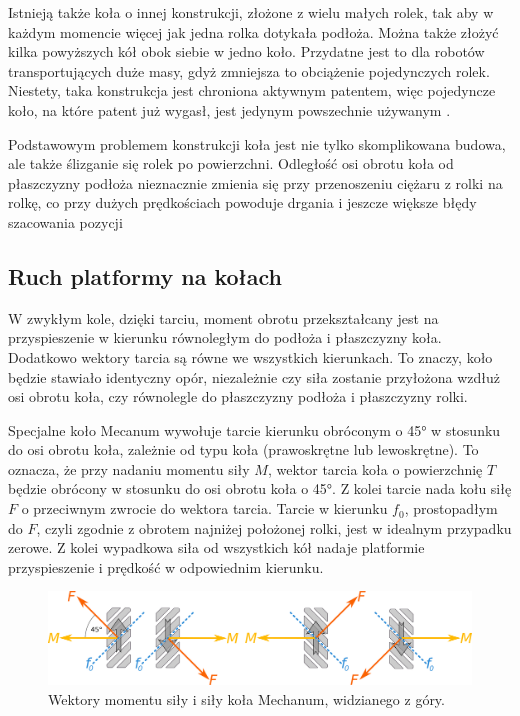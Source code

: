 	Istnieją także koła o innej konstrukcji, złożone z wielu małych rolek, tak aby w każdym momencie więcej jak jedna rolka dotykała podłoża.
	Można także złożyć kilka powyższych kół obok siebie w jedno koło.
	Przydatne jest to dla robotów transportujących duże masy, gdyż zmniejsza to obciążenie pojedynczych rolek.
	Niestety, taka konstrukcja jest chroniona aktywnym patentem, więc pojedyncze koło, na które patent już wygasł, jest jedynym powszechnie używanym \cite{paletobot}.

	Podstawowym problemem konstrukcji koła jest nie tylko skomplikowana budowa, ale także ślizganie się rolek po powierzchni.
	Odległość osi obrotu koła od płaszczyzny podłoża nieznacznie zmienia się przy przenoszeniu ciężaru z rolki na rolkę, co przy dużych prędkościach powoduje drgania i jeszcze większe błędy szacowania pozycji

	\subsection{Ruch platformy na kołach}
		W zwykłym kole, dzięki tarciu, moment obrotu przekształcany jest na przyspieszenie w kierunku równoległym do podłoża i płaszczyzny koła.
		Dodatkowo wektory tarcia są równe we wszystkich kierunkach. To znaczy, koło będzie stawiało identyczny opór, niezależnie czy siła
		zostanie przyłożona wzdłuż osi obrotu koła, czy równolegle do płaszczyzny podłoża i płaszczyzny rolki.
		
		Specjalne koło Mecanum wywołuje tarcie kierunku obróconym o 45° w stosunku do osi obrotu koła, zależnie od typu koła (prawoskrętne lub lewoskrętne). 
		To oznacza, że przy nadaniu momentu siły $M$, wektor tarcia koła o powierzchnię $T$ będzie obrócony w stosunku do osi obrotu koła o 45°.
		Z kolei tarcie nada kołu siłę $F$ o przeciwnym zwrocie do wektora tarcia.
		Tarcie w kierunku $f_0$, prostopadłym do $F$, czyli zgodnie z obrotem najniżej położonej rolki, jest w idealnym przypadku zerowe.
		Z kolei wypadkowa siła od wszystkich kół nadaje platformie przyspieszenie i prędkość w odpowiednim kierunku.

		\begin{figure}[H]
		\centering
		\includegraphics[width=\textwidth]{graphics/vectors.pdf}
		\caption{Wektory momentu siły i siły koła Mechanum, widzianego z góry.}
		\label{fig:wheel_vectors}
		\end{figure} 

